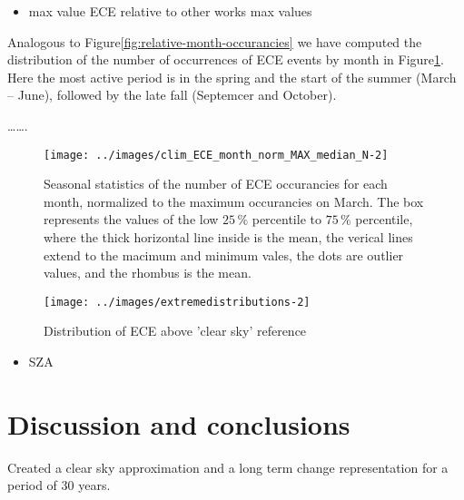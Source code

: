 \documentclass[preprint, 3p,
authoryear]{elsarticle} %
\providecommand{\tightlist}{%
  \setlength{\itemsep}{0pt}\setlength{\parskip}{0pt}}
\begin{document}
\begin{itemize}
\tightlist
\item
  max value ECE relative to other works max values
\end{itemize}

Analogous to Figure\nobreakspace{}\ref{fig:relative-month-occurancies}
we have computed the distribution of the number of occurrences of ECE
events by month in
Figure\nobreakspace{}\ref{fig:relative-month-occurancies-ECE}. Here the
most active period is in the spring and the start of the summer (March
-- June), followed by the late fall (Septemcer and October).

\ldots\ldots.

\begin{figure}

{\centering \texttt{[image: ../images/clim\_ECE\_month\_norm\_MAX\_median\_N-2]} 

}

\caption{Seasonal statistics of the number of ECE occurancies for each month, normalized to the maximum occurancies on March. The box represents the values of the low $25\,\%$ percentile to $75\,\%$ percentile, where the thick horizontal line inside is the mean, the verical lines extend to the macimum and minimum vales, the dots are outlier values, and the rhombus is the mean.}\label{fig:relative-month-occurancies-ECE}
\end{figure}

\begin{figure}

{\centering \texttt{[image: ../images/extremedistributions-2]} 

}

\caption{Distribution of ECE above 'clear sky' reference}\label{fig:unnamed-chunk-3}
\end{figure}

\begin{itemize}
\tightlist
\item
  SZA
\end{itemize}

\hypertarget{discussion-and-conclusions}{%
\section{Discussion and conclusions}\label{discussion-and-conclusions}}

Created a clear sky approximation and a long term change representation
for a period of 30 years.
\end{document}
